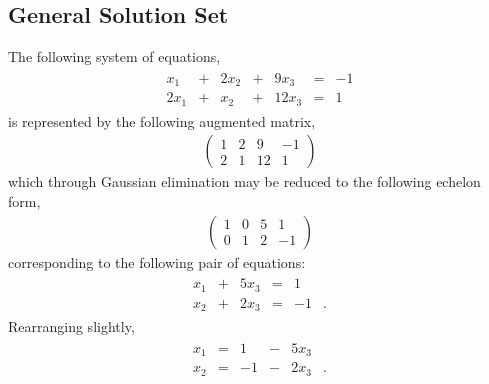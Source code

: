 \documentclass[letterpaper,10pt,english]{jupyterBook}
\begin{document}
\subsection{General Solution Set}
\label{\detokenize{LinearAlgebra/linear_systems_matrices/echelon_form:general-solution-set}}
\sphinxAtStartPar
The following system of equations,
\begin{equation*}
\begin{split}
\begin{alignat*}{4}
x_1 & {}+{} & 2x_2 & {}+{} & 9x_3 & {}={} & -1\\
2x_1 & {}+{} & x_2 & {}+{} & 12x_3 &  {}={} & 1
\end{alignat*}\end{split}
\end{equation*}
\sphinxAtStartPar
is represented by the following augmented matrix,
\begin{equation*}
\begin{split}
\left(\begin{array}{ccc|c}
1 & 2 & 9 & -1\\
2 & 1 & 12 & 1
\end{array}
\right)
\end{split}
\end{equation*}
\sphinxAtStartPar
which through Gaussian elimination may be reduced to the following echelon form,
\begin{equation*}
\begin{split}
\left(\begin{array}{ccc|c}
1 & 0 & 5 & 1\\
0 & 1 & 2 & -1
\end{array}
\right)
\end{split}
\end{equation*}
\sphinxAtStartPar
corresponding to the following pair of equations:
\begin{equation*}
\begin{split}
\begin{alignat*}{3}
x_1 & {}+{} & 5x_3 & {}={} & 1\\
x_2 & {}+{} & 2x_3 &  {}={} & -1&.
\end{alignat*}\end{split}
\end{equation*}
\sphinxAtStartPar
Rearranging slightly,
\begin{equation*}
\begin{split}
\begin{alignat*}{3}
x_1 & {}={} & 1 & {}-{} & 5x_3\\
x_2 & {}={} & -1 & {}-{} & 2x_3 &.
\end{alignat*}\end{split}
\end{equation*}
\end{document}
